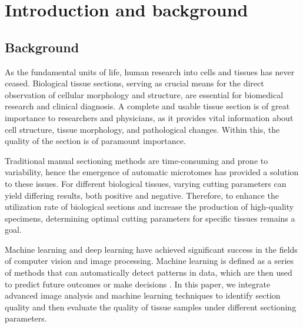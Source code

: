 \section{Introduction and background}
\label{sec:introduction}

\subsection{Background}




As the fundamental units of life, human research into cells and tissues has never ceased. Biological tissue sections, serving as crucial means for the direct observation of cellular morphology and structure, are essential for biomedical research and clinical diagnosis. A complete and usable tissue section is of great importance to researchers and physicians, as it provides vital information about cell structure, tissue morphology, and pathological changes. Within this, the quality of the section is of paramount importance.

Traditional manual sectioning methods are time-consuming and prone to variability, hence the emergence of automatic microtomes has provided a solution to these issues. For different biological tissues, varying cutting parameters can yield differing results, both positive and negative. Therefore, to enhance the utilization rate of biological sections and increase the production of high-quality specimens, determining optimal cutting parameters for specific tissues remains a goal.

Machine learning and deep learning have achieved significant success in the fields of computer vision and image processing. Machine learning is defined as a series of methods that can automatically detect patterns in data, which are then used to predict future outcomes or make decisions \cite{1.1}. In this paper, we integrate advanced image analysis and machine learning techniques to identify section quality and then evaluate the quality of tissue samples under different sectioning parameters.


